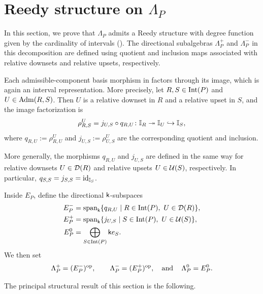 \section{Reedy structure on $\Lambda_P$}
\label{sec:interval-reedy}

In this section, we prove that $\Lambda_P$ admits a Reedy structure
with degree function given by the cardinality of intervals
().
The directional subalgebras $\Lambda_P^+$ and $\Lambda_P^-$ in this
decomposition are defined using quotient and inclusion maps associated with
relative downsets and relative upsets, respectively.

Each admissible-component basis morphism in
 factors through its image,
which is again an interval representation.  More precisely, let $R,S\in\operatorname{Int}(P)$ and
$U\in\operatorname{Adm}(R,S)$.  Then $U$ is a relative downset in $R$ and a relative
upset in $S$, and the image factorization is
\begin{equation}
\label{eq:admissible-component-factorization}
\rho_{R,S}^{U}
=
j_{U,S}\circ q_{R,U}
\colon
\mathbb I_R\twoheadrightarrow\mathbb I_U\hookrightarrow\mathbb I_S,
\end{equation}
where
$q_{R,U}:=\rho_{R,U}^{U}$ and
$j_{U,S}:=\rho_{U,S}^{U}$ are the corresponding quotient and inclusion.

More generally, the morphisms $q_{R,U}$ and $j_{U,S}$ are defined in the same way for
relative downsets $U\in\mathcal D(R)$ and relative upsets
$U\in\mathcal U(S)$, respectively.  In particular,
$q_{S,S}=j_{S,S}=\operatorname{id}_{\mathbb I_S}$.

Inside $E_P$, define the directional $\mathsf{k}$-subspaces
\begin{equation}
\begin{aligned}
E_P^-
&=
\operatorname{span}_{\mathsf{k}}
\{q_{R,U}\mid R\in\operatorname{Int}(P),\ U\in\mathcal D(R)\},\\
E_P^+
&=
\operatorname{span}_{\mathsf{k}}
\{j_{U,S}\mid S\in\operatorname{Int}(P),\ U\in\mathcal U(S)\},\\
E_P^0
&=
\bigoplus_{S\in\operatorname{Int}(P)}\mathsf{k} e_S.
\end{aligned}
\label{eq:interval-directional-subspaces}
\end{equation}
We then set
\begin{equation}
\Lambda_P^+
=
(E_P^-)^{\mathrm{op}},
\qquad
\Lambda_P^-
=
(E_P^+)^{\mathrm{op}},
\operatorname{\quad \text{and} \quad}\nolimits
\Lambda_P^0
=
E_P^0.
\label{eq:interval-Reedy-subspaces}
\end{equation}

The principal structural result of this section is the following.

